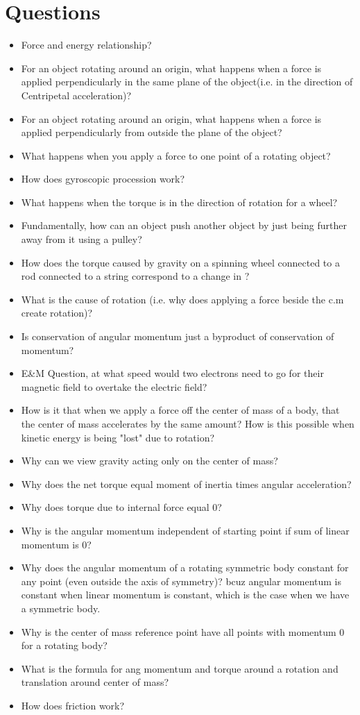 \documentclass{report}
\begin{document}
\chapter{Questions}
\begin{itemize}
    \item Force and energy relationship?
    \item For an object rotating around an origin, what happens when a force is applied perpendicularly in the same plane of the object(i.e. in the direction of Centripetal acceleration)?
    \item For an object rotating around an origin, what happens when a force is applied perpendicularly from outside the plane of the object?
    \item What happens when you apply a force to one point of a rotating object?
    \item How does gyroscopic procession work?
    \item What happens when the torque is in the direction of rotation for a wheel?
    \item Fundamentally, how can an object push another object by just being further away from it using a pulley?
    \item How does the torque caused by gravity on a spinning wheel connected to a rod connected to a string correspond to a change in ?
    \item What is the cause of rotation (i.e. why does applying a force beside the c.m create rotation)?
    \item Is conservation of angular momentum just a byproduct of conservation of momentum?
    \item E\&M Question, at what speed would two electrons need to go for their magnetic field to overtake the electric field?
    \item How is it that when we apply a force off the center of mass of a body, that the center of mass accelerates by the same amount? How is this possible when kinetic energy is being "lost" due to rotation?
    \item Why can we view gravity acting only on the center of mass?
    \item Why does the net torque equal moment of inertia times angular acceleration?
    \item Why does torque due to internal force equal 0?
    \item Why is the angular momentum independent of starting point if sum of linear momentum is 0?
    \item Why does the angular momentum of a rotating symmetric body constant for any point (even outside the axis of symmetry)?
    bcuz angular momentum is constant when linear momentum is constant, which is the case when we have a symmetric body.
    \item Why is the center of mass reference point have all points with momentum 0 for a rotating body?
    \item What is the formula for ang momentum and torque around a rotation and translation around center of mass?
    \item How does friction work?
\end{itemize}
\end{document}
